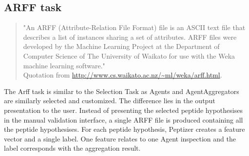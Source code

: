 \subsection{ARFF task}
\begin{quote}
  \textsf{"An ARFF (Attribute-Relation File Format) file is an ASCII text file that describes a list of instances sharing a set of attributes. ARFF files were developed by the Machine Learning Project at the Department of Computer Science of The University of Waikato for use with the Weka machine learning software."}\\Quotation from \url{http://www.cs.waikato.ac.nz/~ml/weka/arff.html}.
 \end{quote}
\npar The Arff task is similar to the Selection Task as Agents and AgentAggregators are similarly selected and customized. The difference lies in the output presentation to the user. Instead of presenting the selected peptide hypothesises in the manual validation interface, a single ARFF file is produced containing all the peptide hypothesises. For each peptide hypothesis, Peptizer creates a feature vector and a single label. One feature relates to one Agent inspection and the label corresponds with the aggregation result.
